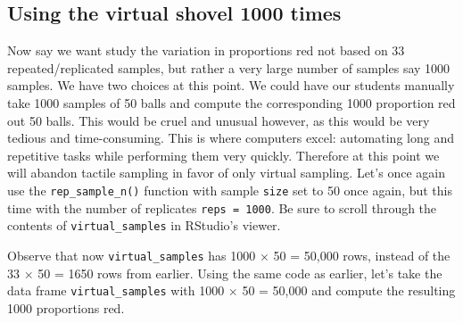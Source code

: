 \documentclass[12pt, krantz2,]{krantz}
\makeatletter
\newenvironment{Shaded}{\begin{snugshade}}{\end{snugshade}}
\newcommand{\DataTypeTok}[1]{\textcolor[rgb]{0.27,0.27,0.27}{#1}}
\newcommand{\DecValTok}[1]{\textcolor[rgb]{0.06,0.06,0.06}{#1}}
\newcommand{\KeywordTok}[1]{\textcolor[rgb]{0.27,0.27,0.27}{\textbf{#1}}}
\newcommand{\NormalTok}[1]{#1}
\newcommand{\OperatorTok}[1]{\textcolor[rgb]{0.43,0.43,0.43}{\textbf{#1}}}
\newcommand{\StringTok}[1]{\textcolor[rgb]{0.5,0.5,0.5}{#1}}
\newenvironment{kframe}{%
\medskip{}
\setlength{\fboxsep}{.8em}
 \def\at@end@of@kframe{}%
 \ifinner\ifhmode%
  \def\at@end@of@kframe{\end{minipage}}%
  \begin{minipage}{\columnwidth}%
 \fi\fi%
 \def\FrameCommand##1{\hskip\@totalleftmargin \hskip-\fboxsep
 \colorbox{shadecolor}{##1}\hskip-\fboxsep
     \hskip-\linewidth \hskip-\@totalleftmargin \hskip\columnwidth}%
 \MakeFramed {\advance\hsize-\width
   \@totalleftmargin\z@ \linewidth\hsize
   \@setminipage}}%
 {\par\unskip\endMakeFramed%
 \at@end@of@kframe}
\renewenvironment{Shaded}{\begin{kframe}}{\end{kframe}}
\makeatother
\begin{document}
\hypertarget{shovel-1000-times}{%
\subsection{Using the virtual shovel 1000 times}\label{shovel-1000-times}}

Now say we want study the variation in proportions red not based on 33 repeated/replicated samples, but rather a very large number of samples say 1000 samples. We have two choices at this point. We could have our students manually take 1000 samples of 50 balls and compute the corresponding 1000 proportion red out 50 balls. This would be cruel and unusual however, as this would be very tedious and time-consuming. This is where computers excel: automating long and repetitive tasks while performing them very quickly. Therefore at this point we will abandon tactile sampling in favor of only virtual sampling. Let's once again use the \texttt{rep\_sample\_n()} function with sample \texttt{size} set to 50 once again, but this time with the number of replicates \texttt{reps\ =\ 1000}. Be sure to scroll through the contents of \texttt{virtual\_samples} in RStudio's viewer.

\begin{Shaded}
\end{Shaded}

Observe that now \texttt{virtual\_samples} has 1000 \(\times\) 50 = 50,000 rows, instead of the 33 \(\times\) 50 = 1650 rows from earlier. Using the same code as earlier, let's take the data frame \texttt{virtual\_samples} with 1000 \(\times\) 50 = 50,000 and compute the resulting 1000 proportions red.

\begin{Shaded}
\end{Shaded}
\end{document}

